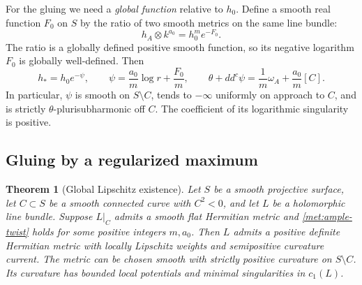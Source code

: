 \documentclass[11pt,a4paper]{article}
\numberwithin{equation}{section}
\newtheorem{theorem}{Theorem}[section]
\theoremstyle{definition}
\theoremstyle{remark}
\newcommand{\ddc}{dd^{c}}
\newcommand{\cOne}{c_1}
\begin{document}
For the gluing we need a \emph{global function} relative to $h_0$.
Define a smooth real function $F_0$ on $S$ by the ratio of two smooth
metrics on the same line bundle:
\[
                       h_A\otimes k^{a_0}=h_0^m e^{-F_0}.
\]
The ratio is a globally defined positive smooth function, so its
negative logarithm $F_0$ is globally well-defined. Then
\begin{equation}\label{met:psi}
   h_*=h_0e^{-\psi},\qquad
   \psi=\frac{a_0}{m}\log r+\frac{F_0}{m},\qquad
   \theta+\ddc\psi=\frac1m\omega_A+\frac{a_0}{m}[C].
\end{equation}
In particular, $\psi$ is smooth on $S\setminus C$, tends to $-\infty$
uniformly on approach to $C$, and is strictly $\theta$-plurisubharmonic
off $C$. The coefficient of its logarithmic singularity is positive.

\subsection{Gluing by a regularized maximum}

\begin{theorem}[Global Lipschitz existence]
\label{met:lipschitz-global}
Let $S$ be a smooth projective surface, let $C\subset S$ be a smooth
connected curve with $C^2<0$, and let $L$ be a holomorphic line bundle.
Suppose $L|_C$ admits a smooth flat Hermitian metric and
\eqref{met:ample-twist} holds for some positive integers $m,a_0$.
Then $L$ admits a positive definite Hermitian metric with locally
Lipschitz weights and semipositive curvature current. The metric can
be chosen smooth with strictly positive curvature on $S\setminus C$.
Its curvature has bounded local potentials and minimal singularities
in $\cOne(L)$.
\end{theorem}
\end{document}
